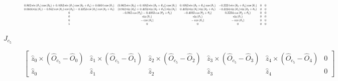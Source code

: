 \documentclass[journal]{new-aiaa}
\begin{document}
\begin{description}
    \[
        \resizebox{\textwidth}{!}{$
        \begin{matrix}0.862 \sin{\left(\theta_{1} \right)} \cos{\left(\theta_{2} \right)} + 0.4053 \sin{\left(\theta_{1} \right)} \cos{\left(\theta_{2} + \theta_{3} \right)} + 0.0604 \cos{\left(\theta_{1} \right)} & \left(0.862 \sin{\left(\theta_{2} \right)} + 0.4053 \sin{\left(\theta_{2} + \theta_{3} \right)}\right) \cos{\left(\theta_{1} \right)} & 0.4053 \sin{\left(\theta_{2} + \theta_{3} \right)} \cos{\left(\theta_{1} \right)} & - 0.3234 \sin{\left(\theta_{2} + \theta_{3} \right)} \cos{\left(\theta_{1} \right)} & 0 & 0\\0.0604 \sin{\left(\theta_{1} \right)} - 0.862 \cos{\left(\theta_{1} \right)} \cos{\left(\theta_{2} \right)} - 0.4053 \cos{\left(\theta_{1} \right)} \cos{\left(\theta_{2} + \theta_{3} \right)} & \left(0.862 \sin{\left(\theta_{2} \right)} + 0.4053 \sin{\left(\theta_{2} + \theta_{3} \right)}\right) \sin{\left(\theta_{1} \right)} & 0.4053 \sin{\left(\theta_{1} \right)} \sin{\left(\theta_{2} + \theta_{3} \right)} & - 0.3234 \sin{\left(\theta_{1} \right)} \sin{\left(\theta_{2} + \theta_{3} \right)} & 0 & 0\\0 & - 0.862 \cos{\left(\theta_{2} \right)} - 0.4053 \cos{\left(\theta_{2} + \theta_{3} \right)} & - 0.4053 \cos{\left(\theta_{2} + \theta_{3} \right)} & 0.3234 \cos{\left(\theta_{2} + \theta_{3} \right)} & 0 & 0\\0 & \sin{\left(\theta_{1} \right)} & \sin{\left(\theta_{1} \right)} & \sin{\left(\theta_{1} \right)} & 0 & 0\\0 & - \cos{\left(\theta_{1} \right)} & - \cos{\left(\theta_{1} \right)} & - \cos{\left(\theta_{1} \right)} & 0 & 0\\1 & 0 & 0 & 0 & 0 & 0\end{matrix}
        $}
    \]

    \item[$J_{c_5}$] \hfill
    $$
    \begin{bmatrix}
        \hat{z}_0 \times (\hat{O}_{c_5} - \hat{O}_0) & \hat{z}_1 \times (\hat{O}_{c_5} - \hat{O}_1) & \hat{z}_2 \times (\hat{O}_{c_5} - \hat{O}_2) & \hat{z}_3 \times (\hat{O}_{c_5} - \hat{O}_3) & \hat{z}_4 \times (\hat{O}_{c_5} - \hat{O}_4) & 0 \\
        \hat{z}_0                                    & \hat{z}_1                                    & \hat{z}_2                                    & \hat{z}_3                                    & \hat{z}_4 & 0
    \end{bmatrix}
    $$


\end{description}
\end{document}
